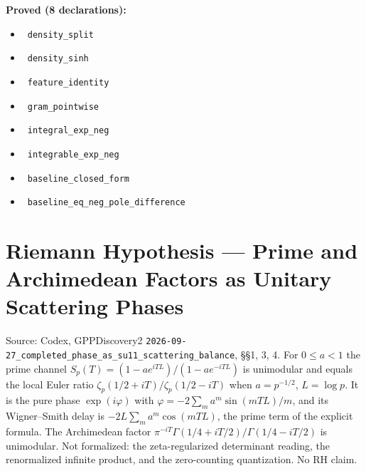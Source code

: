 \documentclass{report}
\theoremstyle{definition}
\begin{document}
\noindent\textbf{Proved (8 declarations):}
\begin{itemize}
  \item {}\leanok\ \texttt{density\_split}
  \item {}\leanok\ \texttt{density\_sinh}
  \item {}\leanok\ \texttt{feature\_identity}
  \item {}\leanok\ \texttt{gram\_pointwise}
  \item {}\leanok\ \texttt{integral\_exp\_neg}
  \item {}\leanok\ \texttt{integrable\_exp\_neg}
  \item {}\leanok\ \texttt{baseline\_closed\_form}
  \item {}\leanok\ \texttt{baseline\_eq\_neg\_pole\_difference}
\end{itemize}

\section{Riemann Hypothesis --- Prime and Archimedean Factors as Unitary Scattering Phases}
Source: Codex, GPPDiscovery2 \texttt{2026-09-27\_completed\_phase\_as\_su11\_scattering\_balance}, \S\S1, 3, 4. For $0\le a<1$ the prime channel $S_p(T)=(1-ae^{iTL})/(1-ae^{-iTL})$ is unimodular and equals the local Euler ratio $\zeta_p(1/2+iT)/\zeta_p(1/2-iT)$ when $a=p^{-1/2}$, $L=\log p$. It is the pure phase $\exp(i\varphi)$ with $\varphi=-2\sum_m a^m\sin(mTL)/m$, and its Wigner--Smith delay is $-2L\sum_m a^m\cos(mTL)$, the prime term of the explicit formula. The Archimedean factor $\pi^{-iT}\Gamma(1/4+iT/2)/\Gamma(1/4-iT/2)$ is unimodular. Not formalized: the zeta-regularized determinant reading, the renormalized infinite product, and the zero-counting quantization. No RH claim.
\end{document}
